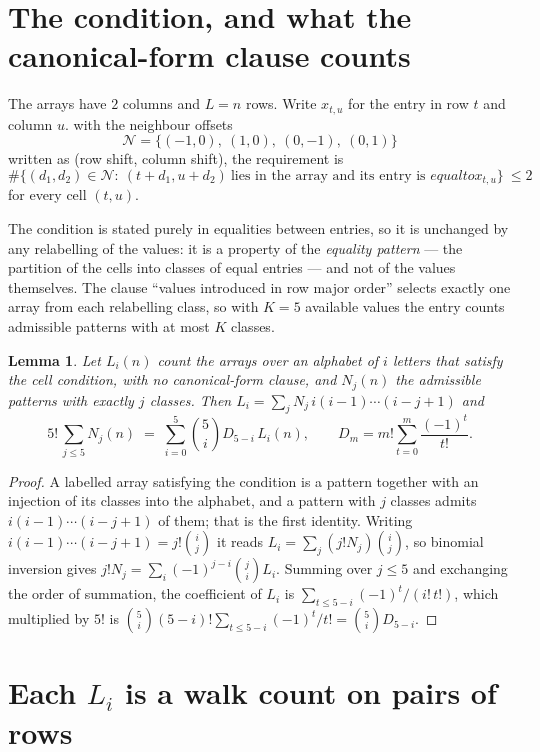 \documentclass[11pt,a4paper]{article}
\theoremstyle{plain}
\newtheorem{lemma}[theorem]{Lemma}
\theoremstyle{definition}
\begin{document}
\section{The condition, and what the canonical-form clause counts}

The arrays have $2$ columns and $L=n$ rows. Write $x_{t,u}$ for the entry in
row $t$ and column $u$. with the neighbour offsets
\[
\mathcal N=\{(-1,0),\ (1,0),\ (0,-1),\ (0,1)\}
\]
written as (row shift, column shift), the requirement is
\begin{equation}\label{eq:loc}
\#\bigl\{(d_1,d_2)\in\mathcal N:\ (t+d_1,u+d_2)\ \text{lies in the array and its entry is }
equal to x_{t,u}\bigr\}\ \le2
\end{equation}
for every cell $(t,u)$.

The condition is stated purely in equalities between entries, so it is unchanged by any
relabelling of the values: it is a property of the \emph{equality pattern} --- the partition
of the cells into classes of equal entries --- and not of the values themselves. The clause
``values introduced in row major order'' selects exactly one array from each relabelling
class, so with $K=5$ available values the entry counts admissible patterns with at most $K$
classes.

\begin{lemma}\label{lem:inv}
Let $L_i(n)$ count the arrays over an alphabet of $i$ letters that satisfy the cell
condition, with no canonical-form clause, and $N_j(n)$ the admissible patterns with exactly
$j$ classes. Then $L_i=\sum_j N_j\,i(i-1)\cdots(i-j+1)$ and
\[
5!\,\sum_{j\le 5}N_j(n)\;=\;\sum_{i=0}^{5}\binom{5}{i}D_{5-i}\,L_i(n),
\qquad D_m=m!\sum_{t=0}^{m}\frac{(-1)^t}{t!} .
\]
\end{lemma}

\begin{proof}
A labelled array satisfying the condition is a pattern together with an injection of its
classes into the alphabet, and a pattern with $j$ classes admits $i(i-1)\cdots(i-j+1)$ of
them; that is the first identity. Writing $i(i-1)\cdots(i-j+1)=j!\binom{i}{j}$ it reads
$L_i=\sum_j(j!N_j)\binom{i}{j}$, so binomial inversion gives
$j!N_j=\sum_i(-1)^{j-i}\binom{j}{i}L_i$. Summing over $j\le5$ and exchanging the
order of summation, the coefficient of $L_i$ is
$\sum_{t\le5-i}(-1)^t/(i!\,t!)$, which multiplied by $5!$ is
$\binom{5}{i}(5-i)!\sum_{t\le5-i}(-1)^t/t!=\binom{5}{i}D_{5-i}$.
\end{proof}

\section{Each $L_i$ is a walk count on pairs of rows}
\end{document}
